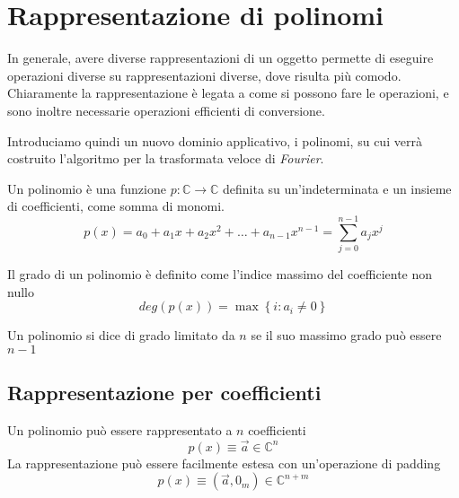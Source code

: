 \section{Rappresentazione di polinomi}
In generale, avere diverse rappresentazioni di un oggetto permette di eseguire operazioni diverse su rappresentazioni diverse, dove risulta più comodo. Chiaramente la rappresentazione è legata a come si possono fare le operazioni, e sono inoltre necessarie operazioni efficienti di conversione.

Introduciamo quindi un nuovo dominio applicativo, i polinomi, su cui verrà costruito l'algoritmo per la trasformata veloce di \textit{Fourier}.

\begin{definition}[Polinomio]
    Un polinomio è una funzione $p: \mathbb{C} \rightarrow \mathbb{C}$ definita su un'indeterminata e un insieme di coefficienti, come somma di monomi.
    \begin{equation*}
        p(x) = a_0 + a_1 x + a_2 x^2 + \dots + a_{n-1} x^{n-1} = \sum_{j=0}^{n-1}a_j x^j
    \end{equation*}
    \label{def:polinomio}
\end{definition}

\begin{definition}
    Il grado di un polinomio è definito come l'indice massimo del coefficiente non nullo
    \begin{equation*}
        deg(p(x)) = \max \left\{ i: a_i \neq 0 \right\}
    \end{equation*}
    \label{def:poligrado}
\end{definition}

\begin{definition}
    Un polinomio si dice di grado limitato da $n$ se il suo massimo grado può essere $n-1$
    \label{def:polilimitato}
\end{definition}

\subsection{Rappresentazione per coefficienti}
Un polinomio può essere rappresentato a $n$ coefficienti
\begin{equation*}
    p(x) \equiv \vec{a} \in \mathbb{C}^n
\end{equation*}
La rappresentazione può essere facilmente estesa con un'operazione di padding
\begin{equation*}
    p(x) \equiv \left( \vec{a}, 0_m \right) \in \mathbb{C}^{n+m}
\end{equation*}

